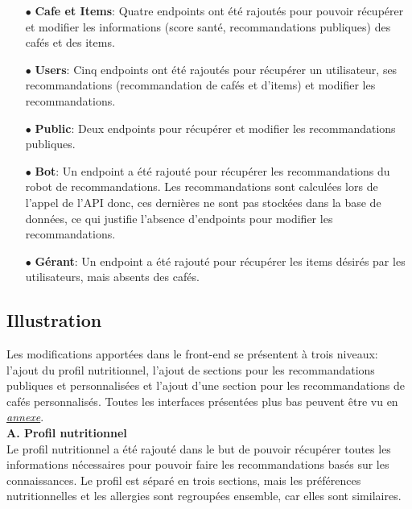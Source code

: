 \documentclass[11pt]{article}
\begin{document}
\begin{itemize}
	\item[$\bullet$] \textbf{Cafe et Items}: Quatre endpoints ont été rajoutés pour pouvoir récupérer et modifier les informations (score santé, recommandations publiques) des cafés et des items.\\
	
	\item[$\bullet$] \textbf{Users}: Cinq endpoints ont été rajoutés pour récupérer un utilisateur, ses recommandations (recommandation de cafés et d'items) et modifier les recommandations.\\
	
	\item[$\bullet$] \textbf{Public}: Deux endpoints pour récupérer et modifier les recommandations publiques.\\
	
	\item[$\bullet$] \textbf{Bot}: Un endpoint a été rajouté pour récupérer les recommandations du robot de recommandations. Les recommandations sont calculées lors de l'appel de l'API donc, ces dernières ne sont pas stockées dans la base de données, ce qui justifie l'absence d'endpoints pour modifier les recommandations.\\
	
	\item[$\bullet$] \textbf{Gérant}: Un endpoint a été rajouté pour récupérer les items désirés par les utilisateurs, mais absents des cafés. \\
	
\end{itemize}

\subsection{Illustration}
Les modifications apportées dans le front-end se présentent à trois niveaux: l'ajout du profil nutritionnel, l'ajout de sections pour les recommandations publiques et personnalisées et l'ajout d'une section pour les recommandations de cafés personnalisés. Toutes les interfaces présentées plus bas peuvent être vu en \hyperref[images]{\textit{annexe}}.\\

\textbf{A. Profil nutritionnel}\\
\label{profileNutritionnel}
Le profil nutritionnel a été rajouté dans le but de pouvoir récupérer toutes les informations nécessaires pour pouvoir faire les recommandations basés sur les connaissances. Le profil est séparé en trois sections, mais les préférences nutritionnelles et les allergies sont regroupées ensemble, car elles sont similaires. \\
\end{document}
